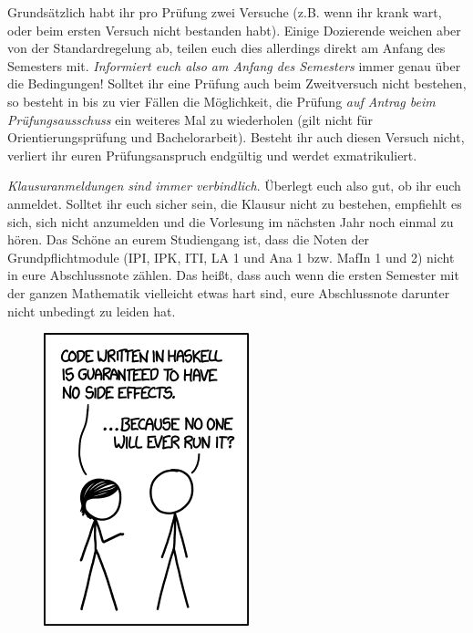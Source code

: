 Grundsätzlich habt ihr pro Prüfung zwei Versuche (z.B. wenn ihr krank wart, oder beim ersten Versuch nicht bestanden habt). Einige Dozierende weichen aber von der Standardregelung ab, teilen euch dies allerdings direkt am Anfang des Semesters mit. \emph{Informiert euch also am Anfang des Semesters} immer genau über die Bedingungen! Solltet ihr eine Prüfung auch beim Zweitversuch nicht bestehen, so besteht in bis zu vier Fällen die Möglichkeit, die Prüfung \emph{auf Antrag beim Prüfungsausschuss} ein weiteres Mal zu wiederholen (gilt nicht für Orientierungsprüfung und Bachelorarbeit). Besteht ihr auch diesen Versuch nicht, verliert ihr euren Prüfungsanspruch endgültig und werdet exmatrikuliert.

\emph{Klausuranmeldungen sind immer verbindlich}. Überlegt euch also gut, ob ihr euch anmeldet. Solltet ihr euch sicher sein, die Klausur nicht zu bestehen, empfiehlt es sich, sich nicht anzumelden und die Vorlesung im nächsten Jahr noch einmal zu hören. Das Schöne an eurem Studiengang ist, dass die Noten der Grundpflichtmodule (IPI, IPK, ITI, LA 1 und Ana 1 bzw. MafIn 1 und 2) nicht in eure Abschlussnote zählen. Das heißt, dass auch wenn die ersten Semester mit der ganzen Mathematik vielleicht etwas hart sind, eure Abschlussnote darunter nicht unbedingt zu leiden hat.

\begin{figure}
\centering
\includegraphics[width=.5\linewidth]{bilder/haskell.png}
\end{figure}

